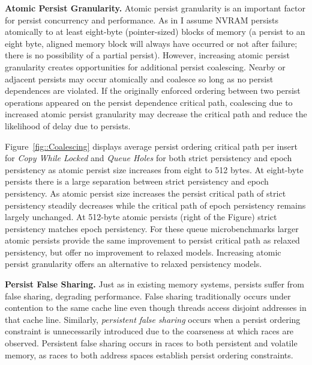 \textbf{Atomic Persist Granularity.}
Atomic persist granularity is an important factor for persist concurrency and performance.
As in \cite{Condit09} I assume NVRAM persists atomically to at least eight-byte (pointer-sized) blocks of memory (a persist to an eight byte, aligned memory block will always have occurred or not after failure; there is no possibility of a partial persist).
However, increasing atomic persist granularity creates opportunities for additional persist coalescing.
Nearby or adjacent persists may occur atomically and coalesce so long as no persist dependences are violated.
If the originally enforced ordering between two persist operations appeared on the persist dependence critical path, coalescing due to increased atomic persist granularity may decrease the critical path and reduce the likelihood of delay due to persists.

 

Figure~\ref{fig::Coalescing} displays average persist ordering critical path per insert for \emph{Copy While Locked} and \emph{Queue Holes} for both strict persistency and epoch persistency as atomic persist size increases from eight to 512 bytes.
At eight-byte persists there is a large separation between strict persistency and epoch persistency.
As atomic persist size increases the persist critical path of strict persistency steadily decreases while the critical path of epoch persistency remains largely unchanged.
At 512-byte atomic persists (right of the Figure) strict persistency matches epoch persistency.
For these queue microbenchmarks larger atomic persists provide the same improvement to persist critical path as relaxed persistency, but offer no improvement to relaxed models.
Increasing atomic persist granularity offers an alternative to relaxed persistency models.

\textbf{Persist False Sharing.}
Just as in existing memory systems, persists suffer from false sharing, degrading performance.
False sharing traditionally occurs under contention to the same cache line even though threads access disjoint addresses in that cache line.
Similarly, \emph{persistent false sharing} occurs when a persist ordering constraint is unnecessarily introduced due to the coarseness at which races are observed.
Persistent false sharing occurs in races to both persistent and volatile memory, as races to both address spaces establish persist ordering constraints.

